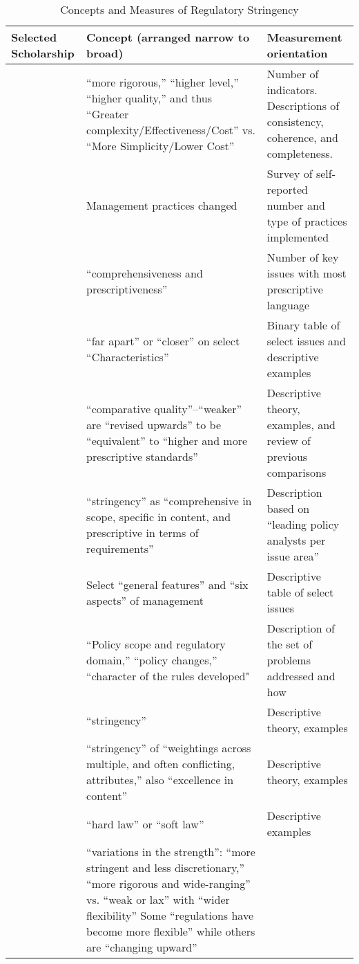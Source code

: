 \begin{table}
\caption{Concepts and Measures of Regulatory Stringency}
\label{review}
\footnotesize
\centering
\raggedright 

\begin{tabular}{p{3.3cm}p{7.5cm}p{4.5cm}}
Selected Scholarship & Concept (arranged narrow to broad) &    Measurement orientation \\
\hline
\citet{Garcia-Montiel2017}&
“more rigorous,” “higher level,” “higher quality,” and thus “Greater complexity/Effectiveness/Cost” vs. “More Simplicity/Lower Cost”&
Number of indicators. Descriptions of consistency, coherence, and completeness.\\
\hline
\citet{Moore2012}&
Management practices changed &    
Survey of self-reported number and type of practices implemented\\
\hline
\citet{McDermott2010} &
“comprehensiveness and prescriptiveness”&
Number of key issues with most prescriptive language\\
\hline
\citet{Overdevest2014}&
“far apart” or “closer” on select “Characteristics”&
Binary table of select issues and descriptive examples\\
\hline
\citet{Overdevest2010}&
“comparative quality”--“weaker” are “revised upwards” to be “equivalent” to “higher and more prescriptive standards”&
Descriptive theory, examples, and review of previous comparisons\\
\hline
\citet{Fransen2011}&
“stringency” as “comprehensive in scope, specific in content, and prescriptive in terms of requirements”&
Description based on “leading policy analysts per issue area”\\
\hline
\citet{Hansen2006}&
Select “general features” and “six aspects” of management &
Descriptive table of select issues\\
\hline
\citet{Auld2014}&    
“Policy scope and regulatory domain,” “policy changes,” “character of the rules developed"&
Description of the set of problems addressed and how\\
\hline
\citet{Cashore2004}&    
“stringency”&
Descriptive theory, examples\\
\hline
\citet{Smith2010}&
 “stringency” of “weightings across multiple, and often conflicting, attributes,” also “excellence in content”&
Descriptive theory, examples\\
\hline
\citet{Porter2014}&
“hard law” or “soft law”&
Descriptive examples\\
\hline
\citet{Gulbrandsen2004}&
“variations in the strength”: “more stringent and less discretionary,” “more rigorous and wide-ranging” vs. “weak or lax” with “wider flexibility” Some “regulations have become more flexible” while others are “changing upward”&

\end{tabular}
\end{table}
